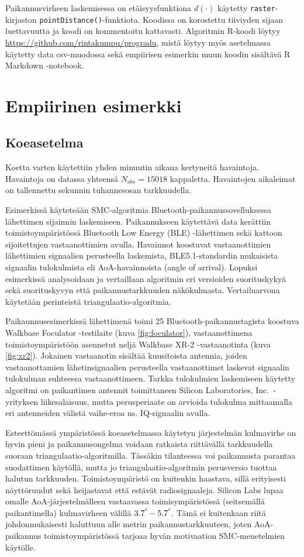 \documentclass[
  12pt,
  a4paper, twoside]{book}
\begin{document}
Paikannusvirheen laskemisessa on etäisyysfunktiona \(d(\cdot)\) käytetty \texttt{raster}-kirjaston \texttt{pointDistance()}-funktiota. Koodissa on korostettu tiiviyden sijaan luettavuutta ja koodi on kommentoitu kattavasti. Algoritmin R-koodi löytyy \url{https://github.com/rintakumpu/progradu}, mistä löytyy myös asetelmassa käytetty data csv-muodossa sekä empiirisen esimerkin muun koodin sisältävä R Markdown -notebook.

\section{Empiirinen esimerkki}

\subsection{Koeasetelma}

Koetta varten käytettiin yhden minuutin aikana kertyneitä havaintoja. Havaintoja on datassa yhteensä \(N_{obs}=15018\) kappaletta. Havaintojen aikaleimat on tallennettu sekunnin tuhannesosan tarkkuudella.

Esimerkissä käyteteään SMC-algoritmia Bluetooth-paikannussovelluksessa lähettimen sijainnin laskemiseen. Paikannukseen käytettävä data kerättiin toimistoympäristössä Bluetooth Low Energy (BLE) -lähettimen sekä kattoon sijoitettujen vastaanottimien avulla. Havainnot koostuvat vastaanottimien lähettimien signaalien perusteella laskemista, BLE5.1-standardin mukaisista signaalin tulokulmista eli AoA-havainnoista (angle of arrival). Lopuksi esimerkissä analysoidaan ja vertaillaan algoritmin eri versioiden suorituskykyä sekä suorituskyvyn että paikannustarkkuuden näkökulmasta. Vertailuarvona käytetään perinteistä triangulaatio-algoritmia.

Paikaunnusesimerkissä lähettimenä toimi 25 Bluetooth-paikannustagista koostuva Walkbase Foculator -testilaite (kuva \ref{fig:foculator}), vastaanottimena toimistoympäristöön asennetut neljä Walkbase XR-2 -vastaanotinta (kuva \ref{fig:xr2}). Jokainen vastaanotin sisältää kuusitoista antennia, joiden vastaanottamien lähetinsignaalien perusteella vastaanottimet laskevat signaalin tulokulman suhteessa vastaanottimeen. Tarkka tulokulmien laskemiseen käytetty algoritmi on paikantimen antennit toimittaneen Silicon Laboratories, Inc.~-yrityksen liikesalaisuus, mutta perusperiaate on arvioida tulokulma mittaamalla eri antenneiden välistä vaihe-eroa ns. IQ-signaalin avulla.

Esteettömässä ympäristössä koeasetelmassa käytetyn järjestelmän kulmavirhe on hyvin pieni ja paikannusongelma voidaan ratkaista riittävällä tarkkuudella suoraan triangulaatio-algoritmilla. Tässäkin tilanteessa voi paikannusta parantaa suodattimen käytöllä, mutta jo triangulaatio-algoritmin perusversio tuottaa halutun tarkkuuden. Toimistoympäristö on kuitenkin haastava, sillä erityisesti näyttöruudut sekä heijastavat että estävät radiosignaaleja. Silicon Labs lupaa omalle AoA-järjestelmälleen vastaavassa toimisympäristössä (seitsemällä paikantimella) kulmavirheen välillä \(3.7^\degree-5.7^\degree\). Tämä ei kuitenkaan riitä johdonmukaisesti haluttuun alle metrin paikannustarkkuuteen, joten AoA-paikannus toimistoympäristössä tarjoaa hyvän motivaation SMC-menetelmien käytölle.
\end{document}
